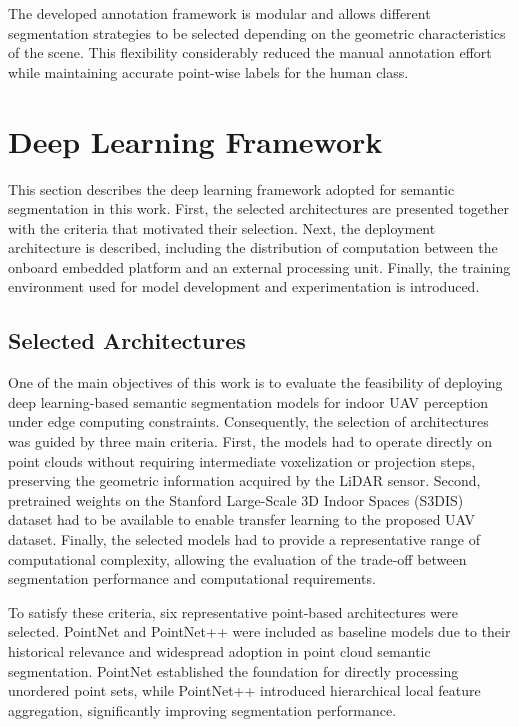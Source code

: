 The developed annotation framework is modular and allows different segmentation strategies to be selected depending on the geometric characteristics of the scene. This flexibility considerably reduced the manual annotation effort while maintaining accurate point-wise labels for the human class.



\section{Deep Learning Framework}
\label{sec:deep_learning_framework}
This section describes the deep learning framework adopted for semantic segmentation in this work. First, the selected architectures are presented together with the criteria that motivated their selection. Next, the deployment architecture is described, including the distribution of computation between the onboard embedded platform and an external processing unit. Finally, the training environment used for model development and experimentation is introduced.

\subsection{Selected Architectures}
\label{subsec:selected_architectures}
One of the main objectives of this work is to evaluate the feasibility of deploying deep learning-based semantic segmentation models for indoor UAV perception under edge computing constraints. Consequently, the selection of architectures was guided by three main criteria. First, the models had to operate directly on point clouds without requiring intermediate voxelization or projection steps, preserving the geometric information acquired by the LiDAR sensor. Second, pretrained weights on the Stanford Large-Scale 3D Indoor Spaces (S3DIS) dataset had to be available to enable transfer learning to the proposed UAV dataset. Finally, the selected models had to provide a representative range of computational complexity, allowing the evaluation of the trade-off between segmentation performance and computational requirements.

To satisfy these criteria, six representative point-based architectures were selected. PointNet \cite{Qi2017PointNet} and PointNet++ \cite{Qi2017PointNetPP} were included as baseline models due to their historical relevance and widespread adoption in point cloud semantic segmentation. PointNet established the foundation for directly processing unordered point sets, while PointNet++ introduced hierarchical local feature aggregation, significantly improving segmentation performance.


